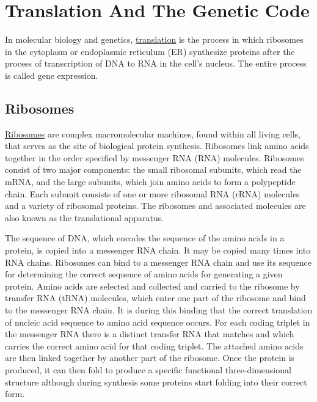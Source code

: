 \hypertarget{translation-and-the-genetic-code}{%
\chapter{Translation And The Genetic Code}\label{translation-and-the-genetic-code}}

In molecular biology and genetics, \href{https://en.wikipedia.org/wiki/Translation_(biology)}{translation} is the process in which ribosomes in the cytoplasm or endoplasmic reticulum (ER) synthesize proteins after the process of transcription of DNA to RNA in the cell's nucleus. The entire process is called gene expression.

\hypertarget{ribosomes}{%
\section{Ribosomes}\label{ribosomes}}

\href{https://en.wikipedia.org/wiki/Ribosome}{Ribosomes} are complex macromolecular machines, found within all living cells, that serves as the site of biological protein synthesis. Ribosomes link amino acids together in the order specified by messenger RNA (RNA) molecules. Ribosomes consist of two major components: the small ribosomal subunits, which read the mRNA, and the large subunits, which join amino acids to form a polypeptide chain. Each subunit consists of one or more ribosomal RNA (rRNA) molecules and a variety of ribosomal proteins. The ribosomes and associated molecules are also known as the translational apparatus.

The sequence of DNA, which encodes the sequence of the amino acids in a protein, is copied into a messenger RNA chain. It may be copied many times into RNA chains. Ribosomes can bind to a messenger RNA chain and use its sequence for determining the correct sequence of amino acids for generating a given protein. Amino acids are selected and collected and carried to the ribosome by transfer RNA (tRNA) molecules, which enter one part of the ribosome and bind to the messenger RNA chain. It is during this binding that the correct translation of nucleic acid sequence to amino acid sequence occurs. For each coding triplet in the messenger RNA there is a distinct transfer RNA that matches and which carries the correct amino acid for that coding triplet. The attached amino acids are then linked together by another part of the ribosome. Once the protein is produced, it can then fold to produce a specific functional three-dimensional structure although during synthesis some proteins start folding into their correct form.

